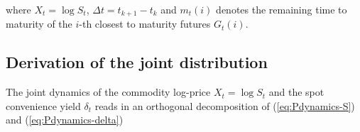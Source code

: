 \documentclass[a4paper,11pt]{article}
\begin{document}
where $X_t=\log{S_t}$, $\Delta{t}=t_{k+1}-t_k$ and $m_t(i)$ denotes
the remaining time to maturity of the $i$-th closest to
maturity futures $G_t(i)$.
\clearpage
\begin{appendix}
\section{Derivation of the joint distribution}\label{sec:deriv-joint-distr}
The joint dynamics of the commodity log-price $X_t = \log{S_t}$ and
the spot convenience yield $\delta_t$ reads in an orthogonal
decomposition of (\ref{eq:Pdynamics-S}) and (\ref{eq:Pdynamics-delta})


\end{appendix}
\end{document}
